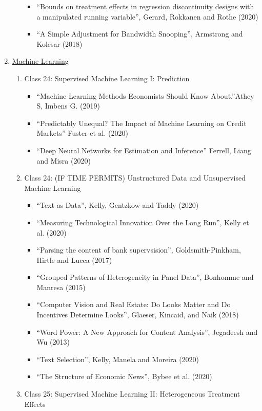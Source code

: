 \documentclass[11pt, a4paper]{article}
\begin{document}
\begin{enumerate}
\begin{enumerate}
\begin{itemize}
    \item ``Bounds on treatment effects in regression discontinuity designs with a manipulated running variable'', Gerard, Rokkanen and Rothe (2020)
    \item ``A Simple Adjustment for Bandwidth Snooping'', Armstrong and Kolesar (2018)
    \end{itemize}     
  \end{enumerate}
\item \underline{Machine Learning}
  \begin{enumerate}
  \item Class 24: Supervised Machine Learning I: Prediction
    \begin{itemize}
    \item ``Machine Learning Methods Economists Should Know About.''Athey S, Imbens G.  (2019)
    \item ``Predictably Unequal? The Impact of Machine Learning on Credit Markets'' Fuster et al. (2020)
    \item ``Deep Neural Networks for Estimation and Inference'' Ferrell, Liang and Misra (2020)
    \end{itemize}
  \item Class 24: (IF TIME PERMITS) Unstructured Data and Unsupervised Machine Learning 
    \begin{itemize}
    \item ``Text as Data'', Kelly, Gentzkow and Taddy (2020)
    \item ``Measuring Technological Innovation Over the Long Run'', Kelly et al. (2020)
    \item ``Parsing the content of bank supervsision'', Goldsmith-Pinkham, Hirtle and Lucca (2017)
    \item ``Grouped Patterns of Heterogeneity in Panel Data'', Bonhomme and Manresa (2015)
    \item ``Computer Vision and Real Estate: Do Looks Matter and Do Incentives Determine Looks'', Glaeser, Kincaid, and Naik (2018)
    \item ``Word Power: A New Approach for Content Analysis'', Jegadeesh and Wu (2013)
    \item ``Text Selection'', Kelly, Manela and Moreira (2020)
    \item ``The Structure of Economic News'', Bybee et al. (2020)
    \end{itemize}
  \item Class 25: Supervised Machine Learning II: Heterogeneous Treatment Effects
    \begin{itemize}

\end{itemize}
\end{enumerate}
\end{enumerate}
\end{document}
